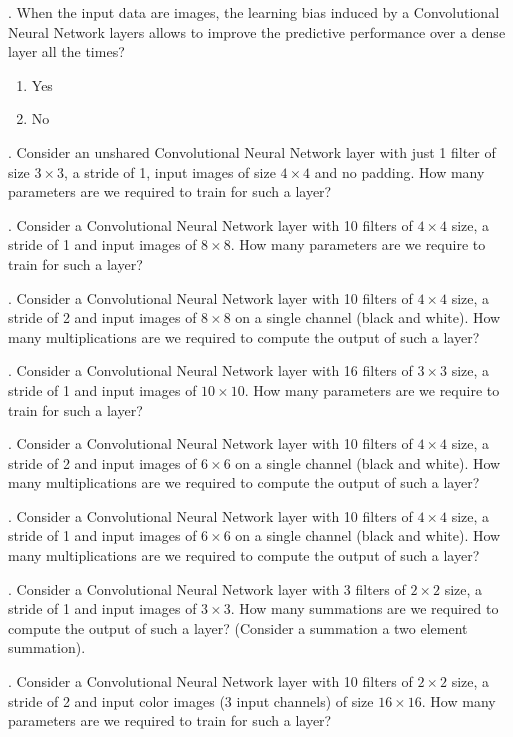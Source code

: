 . When the input data are images, the learning bias induced by a Convolutional Neural Network layers allows to improve the predictive performance over a dense layer all the times?

\begin{enumerate}[label=\roman*]
    \item Yes
    \item No
\end{enumerate}


. Consider an unshared Convolutional Neural Network layer with just 1 filter of size $3 \times 3$, a stride of 1, input images of size $4 \times 4$ and no padding. How many parameters are we required to train for such a layer?

. Consider a Convolutional Neural Network layer with 10 filters of $ 4 \times 4$ size, a stride of 1 and input images of $ 8 \times 8$. How many parameters are we require to train for such a layer?

. Consider a Convolutional Neural Network layer with 10 filters of $ 4 \times 4$ size, a stride of 2 and input images of $ 8 \times 8$ on a single channel (black and white). How many multiplications are we required to compute the output of such a layer?

. Consider a Convolutional Neural Network layer with 16 filters of $ 3 \times 3$ size, a stride of 1 and input images of $ 10 \times 10$. How many parameters are we require to train for such a layer?

. Consider a Convolutional Neural Network layer with 10 filters of $ 4 \times 4$ size, a stride of 2 and input images of $ 6 \times 6$ on a single channel (black and white). How many multiplications are we required to compute the output of such a layer?

. Consider a Convolutional Neural Network layer with 10 filters of $ 4 \times 4$ size, a stride of 1 and input images of $ 6 \times 6$ on a single channel (black and white). How many multiplications are we required to compute the output of such a layer?

. Consider a Convolutional Neural Network layer with 3 filters of $ 2 \times 2$ size, a stride of 1 and input images of $ 3 \times 3$. How many summations are we required to compute the output of such a layer? (Consider a summation a two element summation).

. Consider a Convolutional Neural Network layer with 10 filters of $ 2 \times 2$ size, a stride of 2 and input color images (3 input channels) of size $ 16 \times 16$. How many parameters are we required to train for such a layer?

